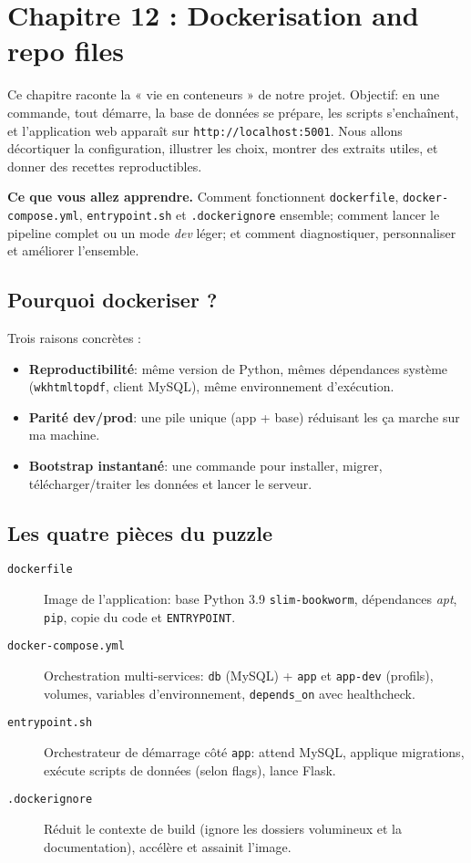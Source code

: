 \chapter{Chapitre 12 : Dockerisation and repo files}

Ce chapitre raconte la « vie en conteneurs » de notre projet. Objectif: en une commande, tout démarre, la base de données se prépare, les scripts s'enchaînent, et l'application web apparaît sur \texttt{http://localhost:5001}. Nous allons décortiquer la configuration, illustrer les choix, montrer des extraits utiles, et donner des recettes reproductibles.

\medskip
\noindent\textbf{Ce que vous allez apprendre.} Comment fonctionnent \texttt{dockerfile}, \texttt{docker-compose.yml}, \texttt{entrypoint.sh} et \texttt{.dockerignore} ensemble; comment lancer le pipeline complet ou un mode \textit{dev} léger; et comment diagnostiquer, personnaliser et améliorer l'ensemble.

\section{Pourquoi dockeriser ?}

Trois raisons concrètes :
\begin{itemize}
  \item \textbf{Reproductibilité}: même version de Python, mêmes dépendances système (\texttt{wkhtmltopdf}, client MySQL), même environnement d'exécution.
  \item \textbf{Parité dev/prod}: une pile unique (app + base) réduisant les \og ça marche sur ma machine\fg{}.
  \item \textbf{Bootstrap instantané}: une commande pour installer, migrer, télécharger/traiter les données et lancer le serveur.
\end{itemize}

\section{Les quatre pièces du puzzle}

\begin{description}
  \item[\texttt{dockerfile}] Image de l'application: base Python 3.9 \texttt{slim-bookworm}, dépendances \textit{apt}, \texttt{pip}, copie du code et \texttt{ENTRYPOINT}.
  \item[\texttt{docker-compose.yml}] Orchestration multi-services: \texttt{db} (MySQL) + \texttt{app} et \texttt{app-dev} (profils), volumes, variables d'environnement, \texttt{depends\_on} avec healthcheck.
  \item[\texttt{entrypoint.sh}] Orchestrateur de démarrage côté \texttt{app}: attend MySQL, applique migrations, exécute scripts de données (selon flags), lance Flask.
  \item[\texttt{.dockerignore}] Réduit le contexte de build (ignore les dossiers volumineux et la documentation), accélère et assainit l'image.
\end{description}

